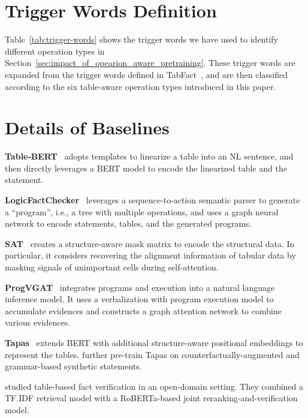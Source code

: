 \documentclass[11pt]{article}
\newcommand{\ie}{{i.e.,}\xspace}
\newcommand{\sstab}{\vspace{0.2ex}\noindent}
\begin{document}
\section{Trigger Words Definition}
\label{appendix:Trigger_Words_Definition}

Table~\ref{tab:trigger-words} shows the trigger words we have used to identify different operation types in Section~\ref{sec:impact_of_opearion_aware_pretraining}. These trigger words are expanded from the trigger words defined in TabFact~\cite{tabert}, and are then classified according to the six table-aware operation types introduced in this paper.

\iffalse
\section{Details of Baselines}
\label{appendix:baselines}
\sstab
{\bf Table-BERT}~\cite{tabfact} adopts templates to linearize a table into an NL sentence, 
and then directly leverages a BERT model to encode the linearized table and the statement.


\sstab
{\bf LogicFactChecker}~\cite{logicfactchecker} leverages a sequence-to-action semantic parser to generate a ``program'', \ie a tree with multiple operations, 
and uses a graph neural network to encode statements, tables, and the generated programs.




\sstab
{\bf SAT}~\cite{sat} creates a structure-aware mask matrix to encode the structural data. In particular, it considers recovering the alignment information of tabular data by masking signals of unimportant cells during self-attention.


\sstab
{\bf ProgVGAT}~\cite{progvgat} integrates programs and execution into a natural language inference model. It uses a verbalization with program execution model to accumulate evidences and constructs a graph attention network to combine various evidences.




\sstab
{\bf Tapas}~\cite{tapas} extends BERT with additional structure-aware positional embeddings to represent the tables. \citealp{tapasfv} further pre-train Tapas on counterfactually-augmented and grammar-based synthetic statements.

\sstab
{\bf \citealp{joint}} studied table-based fact verification in an open-domain setting. They combined a TF.IDF retrieval model with a RoBERTa-based joint reranking-and-verification model.
\end{document}
